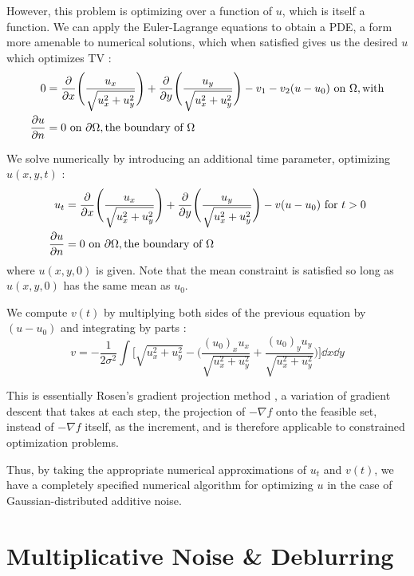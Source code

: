 \documentclass[11pt, oneside]{article}   	%
\begin{document}
However, this problem is optimizing over a function of $u$, which is itself a
function. We can apply the Euler-Lagrange equations to obtain a PDE, a form more
amenable to numerical solutions, which when satisfied gives us the desired $u$
which optimizes TV \cite{rudin1992}:
\begin{align}
  0 &= \pdv{}{x} \Bigg(\frac{u_x}{\sqrt{u_x^2+u_y^2}} \Bigg) +
  \pdv{}{y} \Bigg(\frac{u_y}{\sqrt{u_x^2+u_y^2}} \Bigg) - v_1 - v_2(u - u_0) \text{ on } \Omega, \text{with} \\
  \pdv{u}{n} &= 0 \text{ on } \partial \Omega, \text{the boundary of } \Omega
\end{align}

We solve numerically by introducing an additional time parameter, optimizing
$u(x,y,t)$ \cite{rudin1992}:
\begin{align}
  u_t &= \pdv{}{x} \Bigg(\frac{u_x}{\sqrt{u_x^2+u_y^2}} \Bigg) +
  \pdv{}{y} \Bigg(\frac{u_y}{\sqrt{u_x^2+u_y^2}} \Bigg) - v(u - u_0) \text{ for } t > 0 \\
  \pdv{u}{n} &= 0 \text{ on } \partial \Omega, \text{the boundary of } \Omega
\end{align}
where $u(x,y,0)$ is given. Note that the mean constraint is satisfied so long as
$u(x,y,0)$ has the same mean as $u_0$.

We compute $v(t)$ by multiplying both sides of the previous equation by $(u -
u_0)$ and integrating by parts \cite{rudin1992}:
\begin{equation}
  v = - \frac{1}{2\sigma^2} \int \Bigg[ \sqrt{u_x^2 + u_y^2} -
  \Bigg( \frac{(u_0)_xu_x}{\sqrt{u_x^2+u_y^2}} +
  \frac{(u_0)_yu_y}{\sqrt{u_x^2+u_y^2}} \Bigg) \Bigg] \dd{x} \dd{y}
\end{equation}

This is essentially Rosen's gradient projection method \cite{rudin1992}, a
variation of gradient descent that takes at each step, the projection of $-
\nabla f$ onto the feasible set, instead of $- \nabla f$ itself, as the
increment, and is therefore applicable to constrained optimization problems.

Thus, by taking the appropriate numerical approximations of $u_t$ and $v(t)$, we
have a completely specified numerical algorithm for optimizing $u$ in the case
of Gaussian-distributed additive noise.

\section{Multiplicative Noise \& Deblurring}
\end{document}
